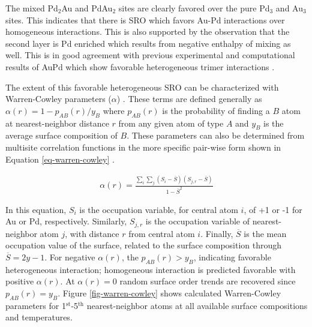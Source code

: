 \documentclass[12pt,oneside]{cmuthesis}
\begin{document}
The mixed Pd\(_{\text{2}}\)Au and PdAu\(_{\text{2}}\) sites are clearly favored over the pure Pd\(_{\text{3}}\) and Au\(_{\text{3}}\) sites. This indicates that there is SRO which favors Au-Pd interactions over homogeneous interactions. This is also supported by the observation that the second layer is Pd enriched which results from negative enthalpy of mixing as well. This is in good agreement with previous experimental and computational results of AuPd which show favorable heterogeneous trimer interactions \cite{sadigh-1999-short-range}.

The extent of this favorable heterogeneous SRO can be characterized with Warren-Cowley parameters (\(\alpha\)) \cite{cowley-1950-x-ray,warren-1990-x,engstfeld-2012-format-atomic}. These terms are defined generally as \(\alpha(r) = 1 - p_{AB}(r)/y_{B}\) where \(p_{AB}(r)\) is the probability of finding a \(B\) atom at nearest-neighbor distance \(r\) from any given atom of type \(A\) and \(y_{B}\) is the average surface composition of \(B\). These parameters can also be determined from multisite correlation functions in the more specific pair-wise form shown in Equation \ref{eq-warren-cowley} \cite{sadigh-1999-short-range}.

\begin{eqnarray} \label{eq-warren-cowley}
\alpha(r) = \frac{\sum_{i}\sum_{j}(S_{i} - \overline{S})(S_{j,r} - \overline{S})}{1 - \overline{S}^{2}}
\end{eqnarray}

In this equation, \(S_{i}\) is the occupation variable, for central atom \(i\), of +1 or -1 for Au or Pd, respectively. Similarly, \(S_{j,r}\) is the occupation variable of nearest-neighbor atom \(j\), with distance \(r\) from central atom \(i\). Finally, \(\overline{S}\) is the mean occupation value of the surface, related to the surface composition through \(\overline{S} = 2y - 1\). For negative \(\alpha(r)\), the \(p_{AB}(r) > y_{B}\), indicating favorable heterogeneous interaction; homogeneous interaction is predicted favorable with positive \(\alpha(r)\). At \(\alpha(r) = 0\) random surface order trends are recovered since \(p_{AB}(r) = y_{B}\). Figure \ref{fig-warren-cowley} shows calculated Warren-Cowley parameters for 1\(^{\text{st}}\)-5\(^{\text{th}}\) nearest-neighbor atoms at all available surface compositions and temperatures.
\end{document}
